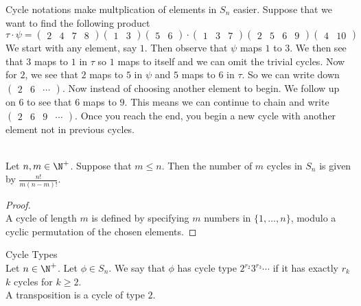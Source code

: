 \documentclass[a4paper]{article}
\begin{document}
Cycle notations make multplication of elements in $S_n$ easier. Suppose that we want to find the following product $$\tau\cdot\psi=\begin{pmatrix}2&4&7&8\end{pmatrix}\begin{pmatrix}1&3\end{pmatrix}\begin{pmatrix}5&6\end{pmatrix}\cdot\begin{pmatrix}1 & 3 & 7\end{pmatrix}\begin{pmatrix}2&5&6&9\end{pmatrix}\begin{pmatrix}4&10\end{pmatrix}$$
We start with any element, say $1$. Then observe that $\psi$ maps $1$ to $3$. We then see that $3$ maps to $1$ in $\tau$ so $1$ maps to itself and we can omit the trivial cycles. Now for $2$, we see that $2$ maps to $5$ in $\psi$ and $5$ maps to $6$ in $\tau$. So we can write down $\begin{pmatrix}2&6&\cdots\end{pmatrix}$. Now instead of choosing another element to begin. We follow up on $6$ to see that $6$ maps to $9$. This means we can continue to chain and write $\begin{pmatrix}2&6&9&\cdots\end{pmatrix}$. Once you reach the end, you begin a new cycle with another element not in previous cycles. 

\begin{prp}{}{}\\
Let $n,m\in\N^+$. Suppose that $m\leq n$. Then the number of $m$ cycles in $S_n$ is given by $\frac{n!}{m(n-m)!}$. 
\begin{proof}\\
A cycle of length $m$ is defined by specifying $m$ numbers in $\{1,\dots,n\}$, modulo a cyclic permutation of the chosen elements. 
\end{proof}
\end{prp}

\begin{defn}{Cycle Types}{}\\
Let $n\in\N^+$. Let $\phi\in S_n$. We say that $\phi$ has cycle type $2^{r_2}3^{r_3}\cdots$ if it has exactly $r_k$ $k$ cycles for $k\geq 2$. \\
A transposition is a cycle of type $2$. 
\end{defn}
\end{document}
